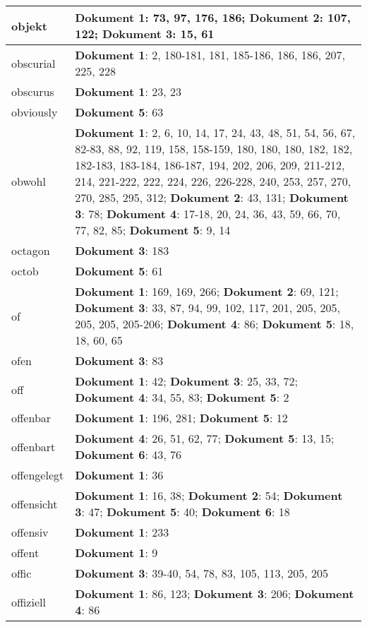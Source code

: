 \documentclass[a5paper]{article}
\begin{document}
\begin{longtable}[l]{|l|p{3in}|}
\hline
objekt & \textbf{Dokument 1}: 73, 97, 176, 186; \textbf{Dokument 2}: 107, 122; \textbf{Dokument 3}: 15, 61 \\
\hline
obscurial & \textbf{Dokument 1}: 2, 180-181, 181, 185-186, 186, 186, 207, 225, 228 \\
\hline
obscurus & \textbf{Dokument 1}: 23, 23 \\
\hline
obviously & \textbf{Dokument 5}: 63 \\
\hline
obwohl & \textbf{Dokument 1}: 2, 6, 10, 14, 17, 24, 43, 48, 51, 54, 56, 67, 82-83, 88, 92, 119, 158, 158-159, 180, 180, 180, 182, 182, 182-183, 183-184, 186-187, 194, 202, 206, 209, 211-212, 214, 221-222, 222, 224, 226, 226-228, 240, 253, 257, 270, 270, 285, 295, 312; \textbf{Dokument 2}: 43, 131; \textbf{Dokument 3}: 78; \textbf{Dokument 4}: 17-18, 20, 24, 36, 43, 59, 66, 70, 77, 82, 85; \textbf{Dokument 5}: 9, 14 \\
\hline
octagon & \textbf{Dokument 3}: 183 \\
\hline
octob & \textbf{Dokument 5}: 61 \\
\hline
of & \textbf{Dokument 1}: 169, 169, 266; \textbf{Dokument 2}: 69, 121; \textbf{Dokument 3}: 33, 87, 94, 99, 102, 117, 201, 205, 205, 205, 205, 205-206; \textbf{Dokument 4}: 86; \textbf{Dokument 5}: 18, 18, 60, 65 \\
\hline
ofen & \textbf{Dokument 3}: 83 \\
\hline
off & \textbf{Dokument 1}: 42; \textbf{Dokument 3}: 25, 33, 72; \textbf{Dokument 4}: 34, 55, 83; \textbf{Dokument 5}: 2 \\
\hline
offenbar & \textbf{Dokument 1}: 196, 281; \textbf{Dokument 5}: 12 \\
\hline
offenbart & \textbf{Dokument 4}: 26, 51, 62, 77; \textbf{Dokument 5}: 13, 15; \textbf{Dokument 6}: 43, 76 \\
\hline
offengelegt & \textbf{Dokument 1}: 36 \\
\hline
offensicht & \textbf{Dokument 1}: 16, 38; \textbf{Dokument 2}: 54; \textbf{Dokument 3}: 47; \textbf{Dokument 5}: 40; \textbf{Dokument 6}: 18 \\
\hline
offensiv & \textbf{Dokument 1}: 233 \\
\hline
offent & \textbf{Dokument 1}: 9 \\
\hline
offic & \textbf{Dokument 3}: 39-40, 54, 78, 83, 105, 113, 205, 205 \\
\hline
offiziell & \textbf{Dokument 1}: 86, 123; \textbf{Dokument 3}: 206; \textbf{Dokument 4}: 86 \\
\hline

\end{longtable}
\end{document}
